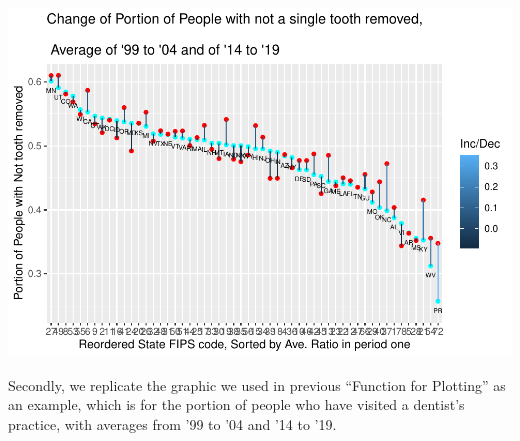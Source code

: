 \documentclass[
]{article}
\begin{document}
\includegraphics{Change_By_State_Graphic_Reproduction_files/figure-latex/unnamed-chunk-8-1.pdf}

Secondly, we replicate the graphic we used in previous ``Function for
Plotting'' as an example, which is for the portion of people who have
visited a dentist's practice, with averages from '99 to '04 and '14 to
'19.
\end{document}
